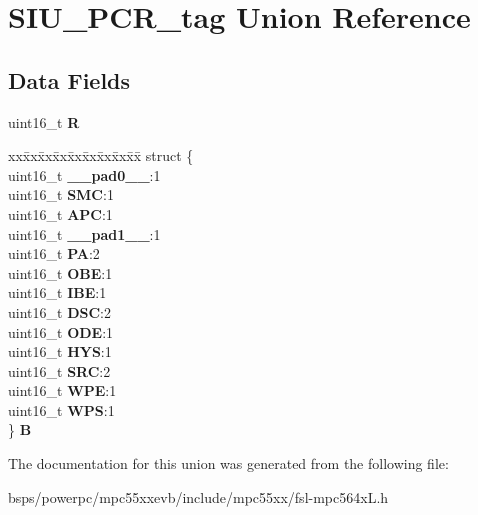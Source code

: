 \hypertarget{unionSIU__PCR__tag}{}\section{S\+I\+U\+\_\+\+P\+C\+R\+\_\+tag Union Reference}
\label{unionSIU__PCR__tag}
\subsection*{Data Fields}
\begin{DoxyCompactItemize}
\item 
\mbox{\label{unionSIU__PCR__tag_ae1c03d6fee9f4b835cd077160b1e28d1}} 
uint16\+\_\+t {\bfseries R}
\item 
\mbox{\label{unionSIU__PCR__tag_aa1489cd49160f9a642bbbd5a9a5fd856}} 
\begin{tabbing}
xx\=xx\=xx\=xx\=xx\=xx\=xx\=xx\=xx\=\kill
struct \{\\
\>uint16\_t {\bfseries \_\_pad0\_\_}:1\\
\>uint16\_t {\bfseries SMC}:1\\
\>uint16\_t {\bfseries APC}:1\\
\>uint16\_t {\bfseries \_\_pad1\_\_}:1\\
\>uint16\_t {\bfseries PA}:2\\
\>uint16\_t {\bfseries OBE}:1\\
\>uint16\_t {\bfseries IBE}:1\\
\>uint16\_t {\bfseries DSC}:2\\
\>uint16\_t {\bfseries ODE}:1\\
\>uint16\_t {\bfseries HYS}:1\\
\>uint16\_t {\bfseries SRC}:2\\
\>uint16\_t {\bfseries WPE}:1\\
\>uint16\_t {\bfseries WPS}:1\\
\} {\bfseries B}\\

\end{tabbing}\end{DoxyCompactItemize}


The documentation for this union was generated from the following file\+:\begin{DoxyCompactItemize}
\item 
bsps/powerpc/mpc55xxevb/include/mpc55xx/fsl-\/mpc564x\+L.\+h\end{DoxyCompactItemize}

